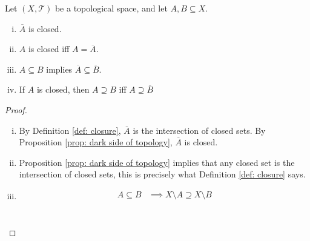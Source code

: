 \begin{proposition}
	\label{prop: properties of closures}
	Let $(X, \mathcal T)$ be a topological space, and let $A, B \subseteq X$.
	\begin{enumerate}[(i)]
		\item
		$\overline A$ is closed.
		
		\item
		$A$ is closed iff $A = \overline A$.
		
		\item
		$A \subseteq B$ implies $\overline A \subseteq \overline B$.
		
		\item
		If $A$ is closed, then $A \supseteq B$ iff $A \supseteq \overline B$
	\end{enumerate}
	
	\begin{proof} \
		\begin{enumerate}[(i)]
			\item
			By Definition \ref{def: closure}, $\overline A$ is the intersection of closed sets. By Proposition \ref{prop: dark side of topology}, $\overline A$ is closed.
			
			\item
			Proposition \ref{prop: dark side of topology} implies that any closed set is the intersection of closed sets, this is precisely what Definition \ref{def: closure} says.
			
			\item
			$$
			\begin{aligned}
				A \subseteq B &\implies X \setminus A \supseteq X \setminus B \\
			\end{aligned}
			$$
			
			$$
			\begin{aligned}
				
			\end{aligned}
			$$
			
		\end{enumerate}
	\end{proof}
\end{proposition}



